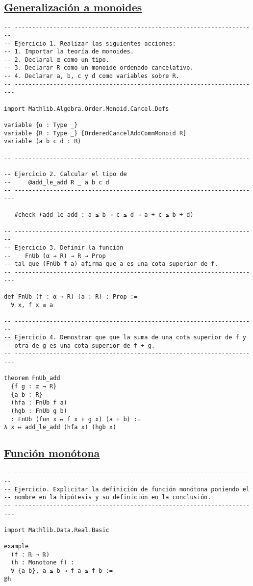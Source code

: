 \subsection{\href{./src/Logica/Generalizacion\_a\_monoides.lean}{Generalización a monoides}}
\label{sec:org0227b96}
\begin{verbatim}
-- ---------------------------------------------------------------------
-- Ejercicio 1. Realizar las siguientes acciones:
-- 1. Importar la teoría de monoides.
-- 2. Declaral α como un tipo.
-- 3. Declarar R como un monoide ordenado cancelativo.
-- 4. Declarar a, b, c y d como variables sobre R.
-- ----------------------------------------------------------------------

import Mathlib.Algebra.Order.Monoid.Cancel.Defs

variable {α : Type _}
variable {R : Type _} [OrderedCancelAddCommMonoid R]
variable (a b c d : R)

-- ---------------------------------------------------------------------
-- Ejercicio 2. Calcular el tipo de
--     @add_le_add R _ a b c d
-- ----------------------------------------------------------------------

-- #check (add_le_add : a ≤ b → c ≤ d → a + c ≤ b + d)

-- ---------------------------------------------------------------------
-- Ejercicio 3. Definir la función
--    FnUb (α → R) → R → Prop
-- tal que (FnUb f a) afirma que a es una cota superior de f.
-- ----------------------------------------------------------------------

def FnUb (f : α → R) (a : R) : Prop :=
  ∀ x, f x ≤ a

-- ---------------------------------------------------------------------
-- Ejercicio 4. Demostrar que que la suma de una cota superior de f y
-- otra de g es una cota superior de f + g.
-- ----------------------------------------------------------------------

theorem FnUb_add
  {f g : α → R}
  {a b : R}
  (hfa : FnUb f a)
  (hgb : FnUb g b)
  : FnUb (fun x ↦ f x + g x) (a + b) :=
λ x ↦ add_le_add (hfa x) (hgb x)
\end{verbatim}

\subsection{\href{./src/Logica/Funcion\_monotona.lean}{Función monótona}}
\label{sec:org7604495}
\begin{verbatim}
-- ---------------------------------------------------------------------
-- Ejercicio. Explicitar la definición de función monótona poniendo el
-- nombre en la hipótesis y su definición en la conclusión.
-- ----------------------------------------------------------------------

import Mathlib.Data.Real.Basic

example
  (f : ℝ → ℝ)
  (h : Monotone f) :
  ∀ {a b}, a ≤ b → f a ≤ f b :=
@h
\end{verbatim}

